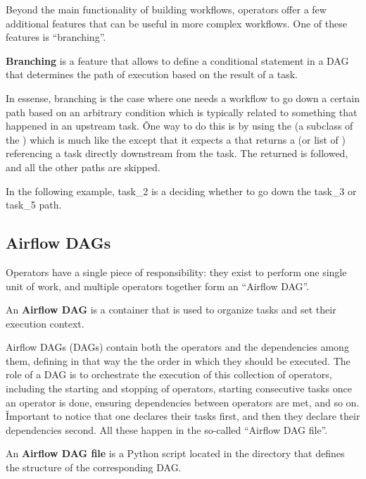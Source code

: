 Beyond the main functionality of building workflows, operators offer a few additional features that can be useful in
more complex workflows. One of these features is ``branching''.

\bd[Branching]
\textbf{Branching} is a feature that allows to define a conditional statement in a DAG that determines the path of
execution based on the result of a task.
\ed

In essense, branching is the case where one needs a workflow to go down a certain path based on an arbitrary
condition which is typically related to something that happened in an upstream task. \v

One way to do this is by using the  (a subclass of the ) which is much
like the  except that it expects a  that returns a  (or list
of ) referencing a task directly downstream from the  task. The
returned is followed, and all the other paths are skipped.

\be
In the following example, task\_2 is a  deciding whether to go down the task\_3 or task\_5
path.

\ee

\subsection{Airflow DAGs}

Operators have a single piece of responsibility: they exist to perform one single unit of work, and multiple operators
together form an ``Airflow DAG''.

An \textbf{Airflow DAG} is a container that is used to organize tasks and set their execution context.
\ed

Airflow DAGs (DAGs) contain both the operators and the dependencies among them, defining in that way the the order
in which they should be executed. The role of a DAG is to orchestrate the execution of this collection of operators,
including the starting and stopping of operators, starting consecutive tasks once an operator is done, ensuring
dependencies between operators are met, and so on. \v

Important to notice that one declares their tasks first, and then they declare their dependencies second. All these
happen in the so-called ``Airflow DAG file''.

An \textbf{Airflow DAG file} is a Python script located in the  directory that defines the structure of the
corresponding DAG\@.
\ed

